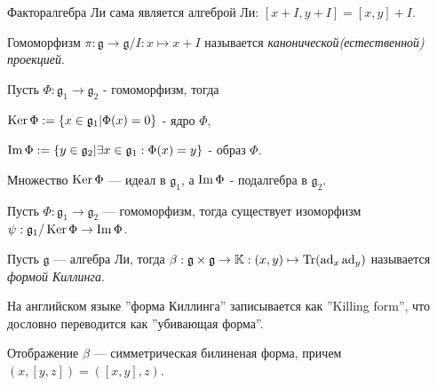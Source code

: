 \begin{ass}
Факторалгебра Ли сама является алгеброй Ли: $[x+I,y+I]=[x,y]+I$.
\end{ass}

\begin{defi}
Гомоморфизм $\pi:\mathfrak{g}\to\mathfrak{g}/I:x\mapsto x+I$ называется \textit{канонической(естественной) проекцией}.
\end{defi}

\begin{defi}
Пусть $\Phi:\mathfrak{g}_1\to\mathfrak{g}_2$ - гомоморфизм, тогда

$\operatorname{Ker}\Phi:=\{x\in\mathfrak{g}_1|\Phi(x)=0\}$ - ядро $\Phi$,

$\operatorname{Im}\Phi:=\{y\in\mathfrak{g}_2|\exists x\in\mathfrak{g}_1:\Phi(x)=y\}$ - образ $\Phi$.
\end{defi}

\begin{ass}
Множество $\operatorname{Ker}\Phi$ — идеал в $\mathfrak{g}_1$, а $\operatorname{Im}\Phi$ - подалгебра в $\mathfrak{g}_2$.
\end{ass}

\begin{thm}
Пусть ${\Phi:\mathfrak{g}_1\to\mathfrak{g}_2}$ — гомоморфизм, тогда существует изоморфизм ${\psi:\mathfrak{g}_1/\operatorname{Ker}\Phi\to\operatorname{Im}\Phi}$.
\end{thm}

\begin{defi}
Пусть $\mathfrak{g}$ — алгебра Ли, тогда $\beta:\mathfrak{g}\times\mathfrak{g}\to\mathbb{K}:(x,y)\mapsto\operatorname{Tr}(\operatorname{ad}_x\operatorname{ad}_y)$ называется \textit{формой Киллинга}.
\end{defi}

\begin{remark}
На английском языке ''форма Киллинга'' записывается как ''Killing form'', что дословно переводится как ''убивающая форма''.
\end{remark}

\begin{ass}
Отображение $\beta$ — симметрическая билиненая форма, причем $(x,[y,z])=([x,y],z)$.
\end{ass}
